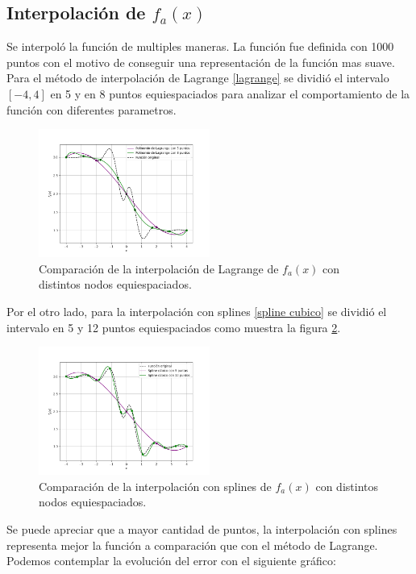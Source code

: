 \documentclass[12pt,a4]{article} %
\begin{document}
\begin{multicols}{2}
\subsection{Interpolación de $f_a(x)$ }
Se interpoló la función de multiples maneras. La función fue definida con 1000 puntos con el motivo de conseguir una representación de la función mas suave. Para el método de interpolación de Lagrange \eqref{lagrange} se dividió el intervalo $[-4,4]$ en 5 y en 8 puntos equiespaciados para analizar el comportamiento de la función con diferentes parametros. 
\begin{figure}[H]
    \centering
    \includegraphics[width=0.5\textwidth]{lagrange.png}
    \caption{Comparación de la interpolación de Lagrange de $f_a(x)$ con distintos nodos equiespaciados.}
    \label{fig:Lagrange}
\end{figure}
Por el otro lado, para la interpolación con splines \eqref{spline cubico} se dividió el intervalo en 5 y 12 puntos equiespaciados como muestra la figura \ref{fig:Splines}. 
\begin{figure}[H]
    \centering
    \includegraphics[width=0.5\textwidth]{splines.png}
    \caption{Comparación de la interpolación con splines de $f_a(x)$ con distintos nodos equiespaciados.}
    \label{fig:Splines}
\end{figure}
Se puede apreciar que a mayor cantidad de puntos, la interpolación con splines representa mejor la función a comparación que con el método de Lagrange. Podemos contemplar la evolución del error con el siguiente gráfico:


\end{multicols}
\end{document}
